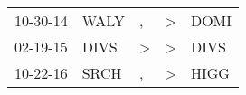 \begin{supertabular}{lllll}
 10-30-14 &  WALY &             , &  \textgreater &  DOMI \\
 02-19-15 &  DIVS &  \textgreater &  \textgreater &  DIVS \\
 10-22-16 &  SRCH &             , &  \textgreater &  HIGG \\
\end{supertabular}

